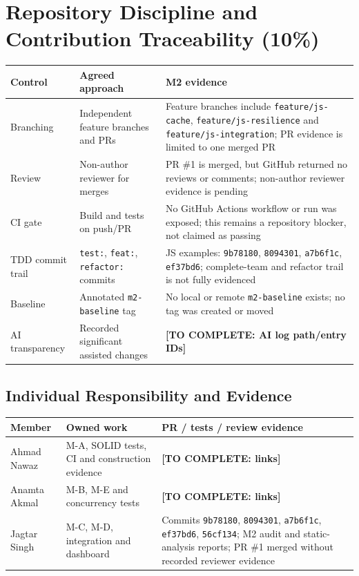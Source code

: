 \documentclass[12pt,a4paper]{article}
\newcommand{\ma}{Ahmad Nawaz}
\newcommand{\mb}{Anamta Akmal}
\newcommand{\mc}{Jagtar Singh}
\newcommand{\todo}[1]{\textcolor{red!70!black}{\textbf{[TO COMPLETE: #1]}}}
\begin{document}
\section{Repository Discipline and Contribution Traceability (10\%)}\label{sec:repo}
\begin{longtable}{L{3.0cm} L{4.3cm} L{5cm}}\toprule
\textbf{Control} & \textbf{Agreed approach} & \textbf{M2 evidence}\\\midrule\endhead
Branching & Independent feature branches and PRs & Feature branches include \texttt{feature/js-cache}, \texttt{feature/js-resilience} and \texttt{feature/js-integration}; PR evidence is limited to one merged PR\\
Review & Non-author reviewer for merges & PR \#1 is merged, but GitHub returned no reviews or comments; non-author reviewer evidence is pending\\
CI gate & Build and tests on push/PR & No GitHub Actions workflow or run was exposed; this remains a repository blocker, not claimed as passing\\
TDD commit trail & \texttt{test:}, \texttt{feat:}, \texttt{refactor:} commits & JS examples: \texttt{9b78180}, \texttt{8094301}, \texttt{a7b6f1c}, \texttt{ef37bd6}; complete-team and refactor trail is not fully evidenced\\
Baseline & Annotated \texttt{m2-baseline} tag & No local or remote \texttt{m2-baseline} exists; no tag was created or moved\\
AI transparency & Recorded significant assisted changes & \todo{AI log path/entry IDs}\\\bottomrule\end{longtable}
\subsection{Individual Responsibility and Evidence}
\begin{longtable}{L{2.7cm} L{4.4cm} L{5.2cm}}\toprule
\textbf{Member} & \textbf{Owned work} & \textbf{PR / tests / review evidence}\\\midrule\endhead
\ma & M-A, SOLID tests, CI and construction evidence & \todo{links}\\
\mb & M-B, M-E and concurrency tests & \todo{links}\\
\mc & M-C, M-D, integration and dashboard & Commits \texttt{9b78180}, \texttt{8094301}, \texttt{a7b6f1c}, \texttt{ef37bd6}, \texttt{56cf134}; M2 audit and static-analysis reports; PR \#1 merged without recorded reviewer evidence\\\bottomrule\end{longtable}
\end{document}
